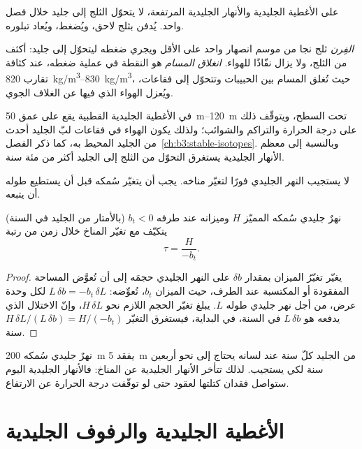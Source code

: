 على الأغطية الجليدية والأنهار الجليدية المرتفعة، لا يتحوّل الثلج إلى جليد
خلال فصل واحد. يُدفن بثلج لاحق، ويُضغط، ويُعاد تبلوره.

\begin{definition}\label{def:b3:glaciology:firn}
\emph{الفِرن} ثلج نجا من موسم انصهار واحد على الأقل
ويجري ضغطه ليتحوّل إلى جليد: أكثف من الثلج، ولا يزال نفّاذًا للهواء.
\emph{انغلاق المسام} هو النقطة في
عملية ضغطه، عند كثافة تقارب \qtyrange{820}{830}{kg/m^3}، حيث
تُغلق المسام بين الحبيبات وتتحوّل إلى فقاعات، ويُعزل الهواء الذي فيها
عن الغلاف الجوي.
\end{definition}

في الأغطية الجليدية القطبية يقع  على عمق \qtyrange{50}{120}{m} تحت
السطح، ويتوقّف ذلك على درجة الحرارة والتراكم
والشوائب؛ ولذلك يكون الهواء في فقاعات لبّ الجليد أحدث من
الجليد المحيط به، كما ذكر الفصل~\ref{ch:b3:stable-isotopes}. وبالنسبة إلى معظم
الأنهار الجليدية يستغرق التحوّل من الثلج إلى الجليد أكثر من مئة سنة.

لا يستجيب النهر الجليدي فورًا لتغيّر مناخه. يجب أن يتغيّر سُمكه
قبل أن يستطيع طوله أن يتبعه.

\begin{proposition}\label{prop:b3:glaciology:response}
نهرٌ جليدي سُمكه المميّز $H$ وميزانه عند طرفه $b_t <
0$ (بالأمتار من الجليد في السنة) يتكيّف مع تغيّر المناخ خلال زمن
من رتبة
\[
\tau = \frac{H}{-b_t} .
\]
\end{proposition}

\begin{proof}
يغيّر تغيّرُ الميزان بمقدار $\delta b$ على النهر الجليدي حجمَه
إلى أن تُعوَّض المساحة المفقودة أو المكتسبة عند الطرف، حيث الميزان $b_t$،
تُعوِّضه: $L\,\delta b = -b_t\,\delta L$ لكل وحدة عرض، من أجل نهر
جليدي طوله $L$. يبلغ تغيّر الحجم اللازم نحو $H\,\delta L$،
وإنّ الاختلال الذي يدفعه هو $L\,\delta b$ في السنة، في البداية، فيستغرق
التغيّر $H\,\delta L/(L\,\delta b) = H/(-b_t)$ سنة.
\end{proof}

نهرٌ جليدي سُمكه \qty{200}{m} يفقد \qty{5}{m} من الجليد كلّ سنة عند
لسانه يحتاج إلى نحو أربعين سنة لكي يستجيب. لذلك تتأخر الأنهار الجليدية عن
المناخ: فالأنهار الجليدية اليوم ستواصل فقدان كتلتها لعقود حتى لو
توقّفت درجة الحرارة عن الارتفاع.

\section{الأغطية الجليدية والرفوف الجليدية}\label{sec:b3:glaciology:ice-sheets}

